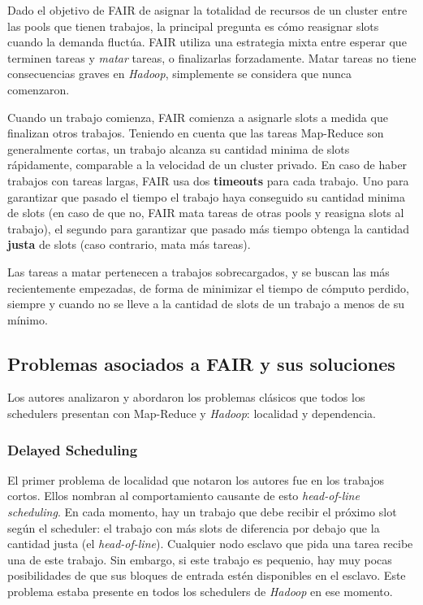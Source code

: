 \vspace{2mm}

Dado el objetivo de FAIR de asignar la totalidad de recursos de un cluster entre las pools que tienen trabajos, la principal pregunta es c\'omo reasignar slots cuando la demanda fluct\'ua. FAIR utiliza una estrategia mixta entre esperar que terminen tareas y \emph{matar} tareas, o finalizarlas forzadamente. Matar tareas no tiene consecuencias graves en \emph{Hadoop}, simplemente se considera que nunca comenzaron.

\vspace{2mm}

Cuando un trabajo comienza, FAIR comienza a asignarle slots a medida que finalizan otros trabajos. Teniendo en cuenta que las tareas Map-Reduce son generalmente cortas, un trabajo alcanza su cantidad minima de slots r\'apidamente, comparable a la velocidad de un cluster privado.
En caso de haber trabajos con tareas largas, FAIR usa dos \textbf{timeouts} para cada trabajo. Uno para garantizar que pasado el tiempo el trabajo haya conseguido su cantidad minima de slots (en caso de que no, FAIR mata tareas de otras pools y reasigna slots al trabajo), el segundo para garantizar que pasado m\'as tiempo obtenga la cantidad \textbf{justa} de slots (caso contrario, mata m\'as tareas).

\vspace{2mm}

Las tareas a matar pertenecen a trabajos sobrecargados, y se buscan las m\'as recientemente empezadas, de forma de minimizar el tiempo de c\'omputo perdido, siempre y cuando no se lleve a la cantidad de slots de un trabajo a menos de su m\'inimo.

\subsection{Problemas asociados a FAIR y sus soluciones}

Los autores analizaron y abordaron los problemas cl\'asicos que todos los schedulers presentan con Map-Reduce y \emph{Hadoop}: localidad y dependencia.

\subsubsection{Delayed Scheduling}

El primer problema de localidad que notaron los autores fue en los trabajos cortos. Ellos nombran al comportamiento causante de esto \emph{head-of-line scheduling}. En cada momento, hay un trabajo que debe recibir el pr\'oximo slot seg\'un el scheduler: el trabajo con m\'as slots de diferencia por debajo que la cantidad justa (el \emph{head-of-line}). Cualquier nodo esclavo que pida una tarea recibe una de este trabajo. Sin embargo, si este trabajo es pequenio, hay muy pocas posibilidades de que sus bloques de entrada est\'en disponibles en el esclavo. Este problema estaba presente en todos los schedulers de \emph{Hadoop} en ese momento.

